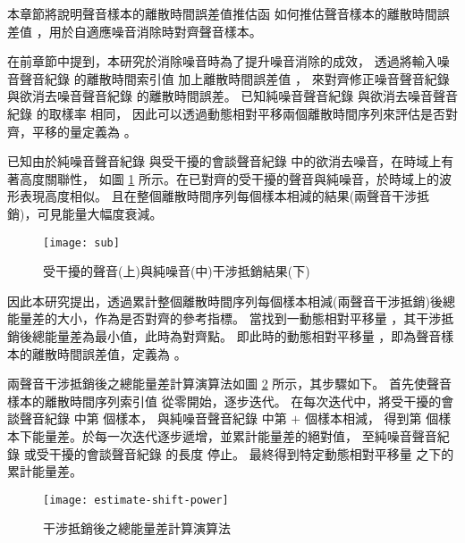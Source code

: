     本章節將說明聲音樣本的離散時間誤差值推估函 \DEFfuncEstm{}
如何推估聲音樣本的離散時間誤差值 \DEFshift，用於自適應噪音消除時對齊聲音樣本。

    在前章節中提到，本研究於消除噪音時為了提升噪音消除的成效，
透過將輸入噪音聲音紀錄 \DEFrecN 的離散時間索引值 \DEFpause 加上離散時間誤差值 \DEFshift，
來對齊修正噪音聲音紀錄 \DEFrecN 與欲消去噪音聲音紀錄 \DEFrecJ 的離散時間誤差。
已知純噪音聲音紀錄 \DEFrecN 與欲消去噪音聲音紀錄 \DEFrecJ 的取樣率 \DEFsamplerate 相同，
因此可以透過動態相對平移兩個離散時間序列來評估是否對齊，平移的量定義為 \DEFcandiSFT。

    已知由於純噪音聲音紀錄 \DEFrecN 與受干擾的會談聲音紀錄 \DEFrecJ 中的欲消去噪音，在時域上有著高度關聯性，
如圖 \ref{fig:estimate-sub} 所示。在已對齊的受干擾的聲音與純噪音，於時域上的波形表現高度相似。
且在整個離散時間序列每個樣本相減的結果(兩聲音干涉抵銷)，可見能量大幅度衰減。

\begin{figure}[H]
    \centering
    \texttt{[image: sub]}
    \caption{受干擾的聲音(上)與純噪音(中)干涉抵銷結果(下)}\label{fig:estimate-sub}
\end{figure}

    因此本研究提出，透過累計整個離散時間序列每個樣本相減(兩聲音干涉抵銷)後總能量差的大小，作為是否對齊的參考指標。
當找到一動態相對平移量 \DEFcandiSFT ，其干涉抵銷後總能量差為最小值，此時為對齊點。
即此時的動態相對平移量 \DEFcandiSFT，即為聲音樣本的離散時間誤差值，定義為 \DEFshift。

    兩聲音干涉抵銷後之總能量差計算演算法如圖 \ref{fig:estimate-power} 所示，其步驟如下。
首先使聲音樣本的離散時間序列索引值 \DEFpause 從零開始，逐步迭代。
在每次迭代中，將受干擾的會談聲音紀錄 \DEFrecJ 中第 \DEFpause  個樣本，
與純噪音聲音紀錄 \DEFrecN 中第 \DEFpause $+$ \DEFcandiSFT 個樣本相減，
得到第 \DEFpause 個樣本下能量差。\DEFpause 於每一次迭代逐步遞增，並累計能量差的絕對值，
至純噪音聲音紀錄 \DEFrecN 或受干擾的會談聲音紀錄 \DEFrecJ 的長度 \DEFtimeLen 停止。
最終得到特定動態相對平移量 \DEFcandiSFT 之下的累計能量差。

\begin{figure}[H]
    \centering
    \texttt{[image: estimate-shift-power]}
    \caption{干涉抵銷後之總能量差計算演算法}\label{fig:estimate-power}
\end{figure}

